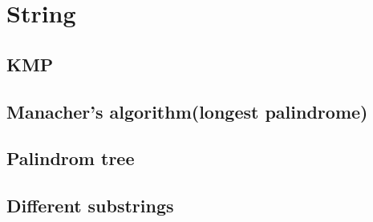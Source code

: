 \newpage
\section{String}

\subsection{KMP}


\subsection{Manacher's algorithm(longest palindrome)}


\subsection{Palindrom tree}


\subsection{Different substrings}
